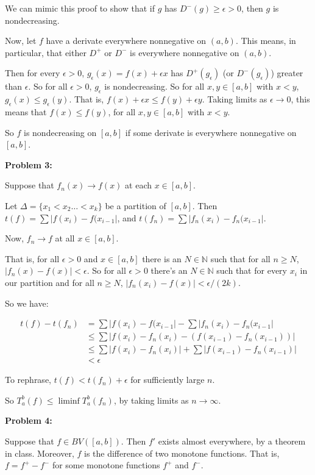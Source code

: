 \documentclass[a4paper,12pt]{article}
\newcommand{\shunt}{\vspace{20mm}}
\newcommand{\absval}[1]{\left\lvert #1 \right\rvert}
\newcommand{\De}{\Delta}
\newcommand{\ep}{\epsilon}
\newcommand{\N}{\mathbb{N}}
\begin{document}
We can mimic this proof to show that if $g$ has $D^-(g) \geq \ep >0$, then $g$ is nondecreasing.

Now, let $f$ have a derivate everywhere nonnegative on $(a,b)$. This means, in particular, that either $D^+$ or $D^-$ is everywhere nonnegative on $(a,b)$.

Then for every $\ep>0$, $g_\ep(x) = f(x) + \ep x$ has $D^+(g_\ep)$ (or $D^-(g_\ep)$) greater than $\ep$. So for all $\ep>0$, $g_\ep$ is nondecreasing. So for all $x,y \in [a,b]$ with $x<y$, $g_\ep(x) \leq g_\ep(y)$. That is, $f(x) + \ep x \leq f(y) + \ep y$. Taking limits as $\ep \to 0$, this means that $f(x) \leq f(y)$, for all $x,y \in [a,b]$ with $x<y$.

So $f$ is nondecreasing on $[a,b]$ if some derivate is everywhere nonnegative on $[a,b]$.

\shunt

{\bf Problem 3:}

Suppose that $f_n(x) \to f(x)$ at each $x \in [a,b]$.

Let $\De = \{x_1 < x_2 \ldots < x_k\}$ be a partition of $[a,b]$. Then $t(f) = \sum \absval{f(x_i)-f(x_{i-1}}$, and  $t(f_n) = \sum \absval{f_n(x_i)-f_n(x_{i-1}}$.

Now, $f_n \to f$ at all $x \in [a,b]$.

That is, for all $\ep >0$ and $x \in [a,b]$ there is an $N \in \N$ such that for all $n \geq N$, $\absval{f_n(x)-f(x)} < \ep$. So for all $\ep>0$ there's an $N \in \N$ such that for every $x_i$ in our partition and for all $n \geq N$, $\absval{f_n(x_i) - f(x)} < \ep/(2k)$. 

So we have:

\begin{align*}
t(f) - t(f_n) &= \sum \absval{f(x_i)-f(x_{i-1}} - \sum \absval{f_n(x_i)-f_n(x_{i-1}} \\
&\leq \sum\absval{f(x_i)-f_n(x_i)-(f(x_{i-1})-f_n(x_{i-1}))} \\
&\leq \sum \absval{f(x_i)-f_n(x_i)} + \sum \absval{f(x_{i-1})-f_n(x_{i-1})}\\
&< \ep
\end{align*}

To rephrase, $t(f) < t(f_n) + \ep$ for sufficiently large $n$.

So $T_a^b(f) \leq \liminf T_a^b(f_n)$, by taking limits as $n \to \infty$.

\shunt

{\bf Problem 4:} 

Suppose that $f \in BV([a,b])$. 
Then $f'$ exists almost everywhere, by a theorem in class. 
Moreover, $f$ is the difference of two monotone functions. 
That is, $f= f^+ -f^-$ for some monotone functions $f^+$ and $f^-$.
\end{document}
